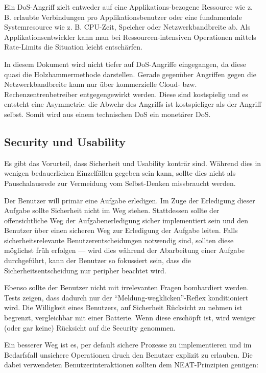 Ein DoS-Angriff zielt entweder auf eine Applikations-bezogene Ressource wie z. B. erlaubte Verbindungen pro Applikationsbenutzer oder eine fundamentale Systemresource wie z. B. CPU-Zeit, Speicher oder Netzwerkbandbreite ab. Als Applikationsentwickler kann man bei Ressourcen-intensiven Operationen mittels Rate-Limits die Situation leicht entschärfen.

In diesem Dokument wird nicht tiefer auf DoS-Angriffe eingegangen, da diese quasi die Holzhammermethode darstellen. Gerade gegenüber Angriffen gegen die Netzwerkbandbreite kann nur über kommerzielle Cloud- bzw. Rechenzentrenbetreiber entgegengewirkt werden. Diese sind kostspielig und es entsteht eine Asymmetrie: die Abwehr des Angriffs ist kostspieliger als der Angriff selbst. Somit wird aus einem technischen DoS ein monetärer DoS.

\subsection{Security und Usability}

Es gibt das Vorurteil, dass Sicherheit und Usability konträr sind. Während dies in wenigen bedauerlichen Einzelfällen gegeben sein kann, sollte dies nicht als Pauschalausrede zur Vermeidung vom Selbst-Denken missbraucht werden.

Der Benutzer will primär eine Aufgabe erledigen. Im Zuge der Erledigung dieser Aufgabe sollte Sicherheit nicht im Weg stehen. Stattdessen sollte der offensichtliche Weg der Aufgabenerledigung sicher implementiert sein und den Benutzer über einen sicheren Weg zur Erledigung der Aufgabe leiten. Falls sicherheitsrelevante Benutzerentscheidungen notwendig sind, sollten diese möglichst früh erfolgen --- wird dies während der Abarbeitung einer Aufgabe durchgeführt, kann der Benutzer so fokussiert sein, dass die Sicherheitsentscheidung nur peripher beachtet wird.

Ebenso sollte der Benutzer nicht mit irrelevanten Fragen bombardiert werden. Tests zeigen, dass dadurch nur der ``Meldung-wegklicken''-Reflex konditioniert wird. Die Willigkeit eines Benutzers, auf Sicherheit Rücksicht zu nehmen ist begrenzt, vergleichbar mit einer Batterie. Wenn diese erschöpft ist, wird weniger (oder gar keine) Rücksicht auf die Security genommen.

Ein besserer Weg ist es, per default sichere Prozesse zu implementieren und im Bedarfsfall unsichere Operationen druch den Benutzer explizit zu erlauben. Die dabei verwendeten Benutzerinteraktionen sollten dem NEAT-Prinzipien genügen:

